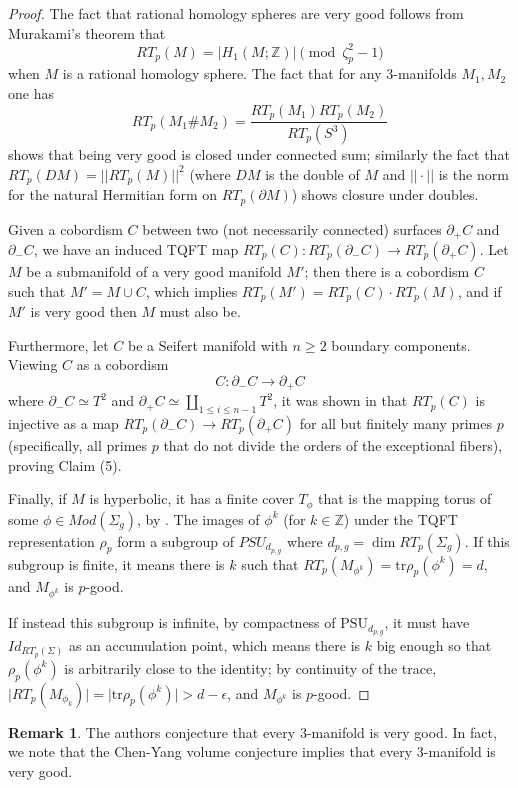 \documentclass[12pt]{amsart}
\theoremstyle{definition}
\newtheorem{rem}[thm]{Remark}
\newcommand{\ra}{\rightarrow}
\newcommand{\Z}{\mathbb{Z}}
\begin{document}
\begin{proof}
	The fact that rational homology spheres are very good follows from Murakami's theorem \cite{Mur95} that $$RT_p(M)=|H_1(M;\Z)| \pmod {\zeta_p^2-1}$$ when $M$ is a rational homology sphere. The fact that for any $3$-manifolds $M_1,M_2$ one has
	$$RT_p(M_1\# M_2)=\frac{RT_p(M_1)RT_p(M_2)}{RT_p(S^3)}$$ shows that being very good is closed under connected sum; similarly the fact that $RT_p(DM)=|| RT_p(M)||^2$ (where $DM$ is the double of $M$ and $||\cdot ||$ is the norm for the natural Hermitian form on $RT_p(\partial M)$) shows closure under doubles.
	
	Given a cobordism $C$ between two (not necessarily connected) surfaces $\partial_+C$ and $\partial_-C$, we have an induced TQFT map $RT_p(C):RT_p(\partial_-C)\ra RT_p(\partial_+C)$. Let $M$ be a submanifold of a very good manifold $M'$; then there is a cobordism $C$ such that $M'= M\cup C$, which implies $RT_p(M')=RT_p(C)\cdot RT_p(M)$, and if $M'$ is very good then $M$ must also be.
	
	Furthermore, let $C$ be a Seifert manifold with $n\geq 2$ boundary components. Viewing $C$ as a cobordism 
	$$C:\partial_-C \longrightarrow \partial_+ C$$
	where $\partial_-C \simeq T^2$ and $\partial_+C\simeq \underset{1\leq i \leq n-1}{\coprod} T^2$, it was shown in \cite{DKM25} that $RT_p(C)$ is injective as a map $RT_p(\partial_-C)\ra RT_p(\partial_+ C)$ for all but finitely many primes $p$ (specifically, all primes $p$ that do not divide the orders of the exceptional fibers), proving Claim (5).
	
	Finally, if $M$ is hyperbolic, it has a finite cover $T_{\phi}$ that is the mapping torus of some $\phi\in Mod(\Sigma_g)$, by \cite{Agol}. The images of $\phi^k$ (for $k\in \Z$) under the TQFT representation $\rho_p$ form a subgroup of $PSU_{d_{p,g}}$ where $d_{p,g}=\dim RT_p(\Sigma_g)$. If this subgroup is finite, it means there is $k$ such that $RT_p(M_{\phi^k})=\mathrm{tr}\rho_p(\phi^k)=d$, and $M_{\phi^k}$ is $p$-good.
	
	 If instead this subgroup is infinite, by compactness of $\mathrm{PSU}_{d_{p,g}}$, it must have $Id_{RT_p(\Sigma)}$ as an accumulation point, which means there is $k$ big enough so that $\rho_p(\phi^k)$ is arbitrarily close to the identity; by continuity of the trace, $\lvert RT_p(M_{\phi_k})\rvert =\lvert\mathrm{tr}\rho_p(\phi^k)\rvert>d-\epsilon$, and $M_{\phi^k}$ is $p$-good.
\end{proof}

\begin{rem}\label{rk:allVeryGood}
The authors conjecture that every $3$-manifold is very good. In fact, we note that the Chen-Yang volume conjecture \cite{CY18} implies that every $3$-manifold is very good.
\end{rem} 
\end{document}
